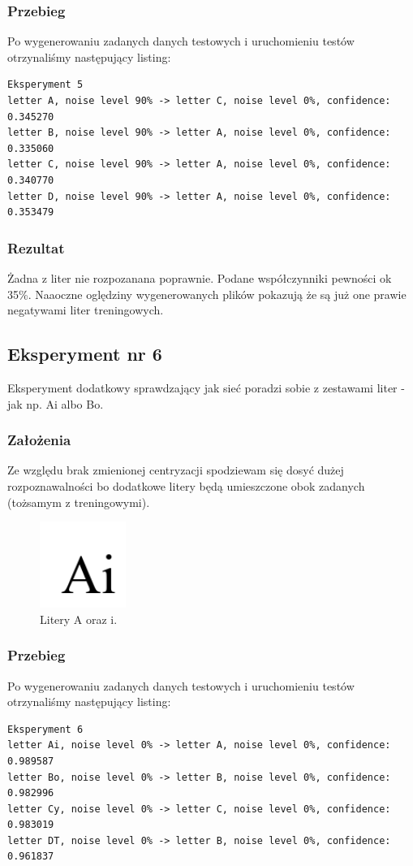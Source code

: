 \documentclass[12pt]{article}
\begin{document}
\subsubsection{Przebieg}
Po wygenerowaniu zadanych danych testowych i uruchomieniu testów otrzynaliśmy następujący listing:
\begin{verbatim}
Eksperyment 5
letter A, noise level 90% -> letter C, noise level 0%, confidence: 0.345270
letter B, noise level 90% -> letter A, noise level 0%, confidence: 0.335060
letter C, noise level 90% -> letter A, noise level 0%, confidence: 0.340770
letter D, noise level 90% -> letter A, noise level 0%, confidence: 0.353479
\end{verbatim}
\subsubsection{Rezultat}
Żadna z liter nie rozpozanana poprawnie. Podane współczynniki pewności ok 35\%. Naaoczne oględziny wygenerowanych plików pokazują że są już one prawie negatywami liter treningowych.

\subsection{Eksperyment nr 6}
Eksperyment dodatkowy sprawdzający jak sieć poradzi sobie z zestawami liter - jak np. Ai albo Bo.

\subsubsection{Założenia}
Ze względu brak zmienionej centryzacji spodziewam się dosyć dużej rozpoznawalności bo dodatkowe litery będą umieszczone obok zadanych (tożsamym z treningowymi).
\begin{figure}[h]
    \centering
    \includegraphics[width=0.25\textwidth]{Ai.png}
    \caption{Litery A oraz i.}
    \label{fig:Ai}
\end{figure}
\subsubsection{Przebieg}
Po wygenerowaniu zadanych danych testowych i uruchomieniu testów otrzynaliśmy następujący listing:
\begin{verbatim}
Eksperyment 6
letter Ai, noise level 0% -> letter A, noise level 0%, confidence: 0.989587
letter Bo, noise level 0% -> letter B, noise level 0%, confidence: 0.982996
letter Cy, noise level 0% -> letter C, noise level 0%, confidence: 0.983019
letter DT, noise level 0% -> letter B, noise level 0%, confidence: 0.961837
\end{verbatim}
\end{document}

